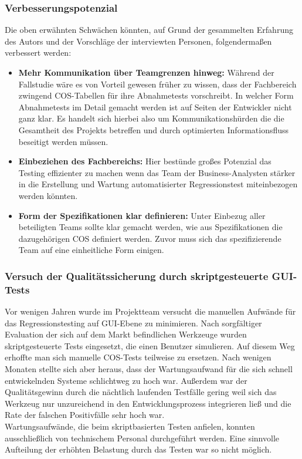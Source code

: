 \subsubsection{Verbesserungspotenzial}
Die oben erwähnten Schwächen könnten, auf Grund der gesammelten Erfahrung des Autors und der Vorschläge der interviewten Personen, folgendermaßen verbessert werden:

\begin{itemize}
\item \textbf{Mehr Kommunikation über Teamgrenzen hinweg:} Während der Fallstudie wäre es von Vorteil gewesen früher zu wissen, dass der Fachbereich zwingend \Gls{COS}-Tabellen für ihre Abnahmetests vorschreibt. In welcher Form Abnahmetests im Detail gemacht werden ist auf Seiten der Entwickler nicht ganz klar. Es handelt sich hierbei also um Kommunikationshürden die die Gesamtheit des Projekts betreffen und durch optimierten Informationsfluss beseitigt werden müssen.
\item \textbf{Einbeziehen des Fachbereichs:} Hier bestünde großes Potenzial das Testing effizienter zu machen wenn das Team der Business-Analysten stärker in die Erstellung und Wartung automatisierter Regressionstest miteinbezogen werden könnten.
\item \textbf{Form der Spezifikationen klar definieren:} Unter Einbezug aller beteiligten Teams sollte klar gemacht werden, wie aus Spezifikationen die dazugehörigen \Gls{COS} definiert werden. Zuvor muss sich das spezifizierende Team auf eine einheitliche Form einigen.
\end{itemize}


\subsubsection{Versuch der Qualitätssicherung durch skriptgesteuerte GUI-Tests}
\label{sec:versuch_script}
Vor wenigen Jahren wurde im Projektteam versucht die manuellen Aufwände für das Regressionstesting auf GUI-Ebene zu minimieren. Nach sorgfältiger Evaluation der sich auf dem Markt befindlichen Werkzeuge wurden skriptgesteuerte Tests eingesetzt, die einen Benutzer simulieren. Auf diesem Weg erhoffte man sich manuelle \Gls{COS}-Tests teilweise zu ersetzen. Nach wenigen Monaten stellte sich aber heraus, dass der Wartungsaufwand für die sich schnell entwickelnden Systeme schlichtweg zu hoch war. Außerdem war der Qualitätsgewinn durch die nächtlich laufenden Testfälle gering weil sich das Werkzeug nur unzureichend in den Entwicklungsprozess integrieren ließ und die Rate der falschen Positivfälle sehr hoch war.\\
Wartungsaufwände, die beim skriptbasierten Testen anfielen, konnten ausschließlich von technischem Personal durchgeführt werden. Eine sinnvolle Aufteilung der erhöhten Belastung durch das Testen war so nicht möglich.

